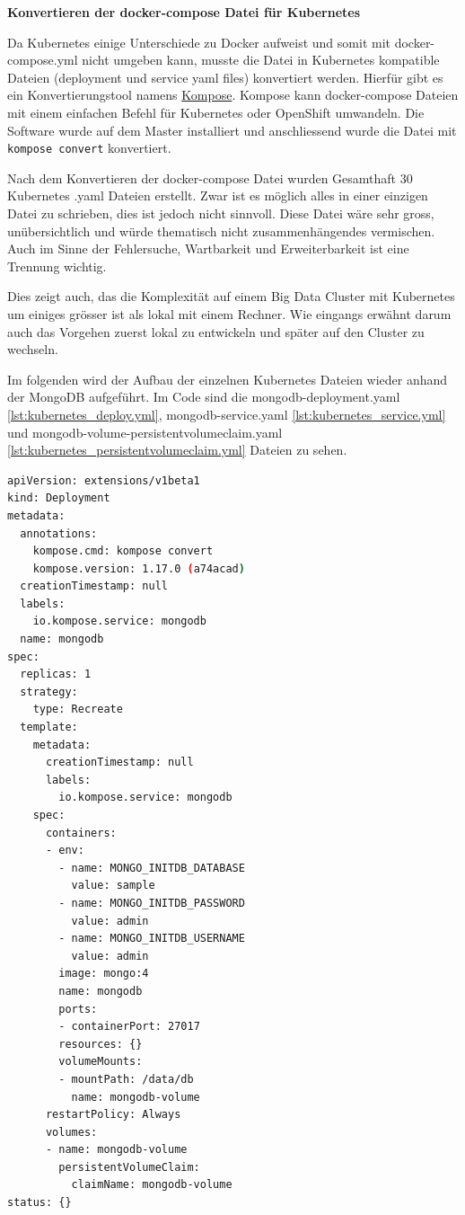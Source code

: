 \textbf{Konvertieren der docker-compose Datei f{\"u}r Kubernetes}

Da Kubernetes einige Unterschiede zu Docker aufweist und somit mit docker-compose.yml nicht umgeben kann, musste die Datei in Kubernetes kompatible Dateien (deployment und service yaml files) konvertiert werden. Hierf{\"u}r gibt es ein Konvertierungstool namens \href{http://kompose.io}{Kompose}. Kompose kann docker-compose Dateien mit einem einfachen Befehl f{\"u}r Kubernetes oder OpenShift umwandeln. Die Software wurde auf dem Master installiert und anschliessend wurde die Datei mit \texttt{kompose convert} konvertiert.

Nach dem Konvertieren der docker-compose Datei wurden Gesamthaft 30 Kubernetes .yaml Dateien erstellt. Zwar ist es m{\"o}glich alles in einer einzigen Datei zu schrieben, dies ist jedoch nicht sinnvoll. Diese Datei w{\"a}re sehr gross, un{\"u}bersichtlich und w{\"u}rde thematisch nicht zusammenh{\"a}ngendes vermischen. Auch im Sinne der Fehlersuche, Wartbarkeit und Erweiterbarkeit ist eine Trennung wichtig. 

Dies zeigt auch, das die Komplexit{\"a}t auf einem Big Data Cluster mit Kubernetes um einiges gr{\"o}sser ist als lokal mit einem Rechner. Wie eingangs erw{\"a}hnt darum auch das Vorgehen zuerst lokal zu entwickeln und sp{\"a}ter auf den Cluster zu wechseln.

Im folgenden wird der Aufbau der einzelnen Kubernetes Dateien wieder anhand der MongoDB aufgef{\"u}hrt. Im Code sind die mongodb-deployment.yaml \ref{lst:kubernetes_deploy.yml},  mongodb-service.yaml \ref{lst:kubernetes_service.yml} und mongodb-volume-persistentvolumeclaim.yaml \ref{lst:kubernetes_persistentvolumeclaim.yml}  Dateien zu sehen.

\begin{lstlisting}[float=h,language=bash,frame=tb,caption={Kubernetes mongodb-deployment.yaml},label=lst:kubernetes_deploy.yml]
apiVersion: extensions/v1beta1
kind: Deployment
metadata:
  annotations:
    kompose.cmd: kompose convert
    kompose.version: 1.17.0 (a74acad)
  creationTimestamp: null
  labels:
    io.kompose.service: mongodb
  name: mongodb
spec:
  replicas: 1
  strategy:
    type: Recreate
  template:
    metadata:
      creationTimestamp: null
      labels:
        io.kompose.service: mongodb
    spec:
      containers:
      - env:
        - name: MONGO_INITDB_DATABASE
          value: sample
        - name: MONGO_INITDB_PASSWORD
          value: admin
        - name: MONGO_INITDB_USERNAME
          value: admin
        image: mongo:4
        name: mongodb
        ports:
        - containerPort: 27017
        resources: {}
        volumeMounts:
        - mountPath: /data/db
          name: mongodb-volume
      restartPolicy: Always
      volumes:
      - name: mongodb-volume
        persistentVolumeClaim:
          claimName: mongodb-volume
status: {}
\end{lstlisting}  

